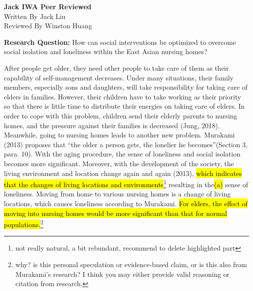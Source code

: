 \documentclass[12pt]{article}
\begin{document}
\begin{center}
    \Large\textbf{Jack IWA Peer Reviewed} \\
    Written By Jack Liu \\
    Reviewed By Winston Huang
\end{center}

\setlength{\marginparwidth}{5cm}  %



\textbf{Research Question:} How can social interventions be optimized to overcome social isolation and loneliness within the East Asian nursing homes? 

After people get older, they need other people to take care of them as their capability of self-management decreases. Under many situations, their family members, especially sons and daughters, will take responsibility for taking care of elders in families. However, their children have to take working as their priority so that there is little time to distribute their energies on taking care of elders.  In order to cope with this problem, children send their elderly parents to nursing homes, and the pressure against their families is decreased (Jung, 2018). Meanwhile, going to nursing homes leads to another new problem. 
Murakami (2013) proposes that “the older a person gets, the lonelier he becomes”(Section 3, para. 10). With the aging procedure, the sense of loneliness and social isolation becomes more significant. Moreover, with the development of the society, the living environment and location change again and again (2013), \hl{which indicates that the changes of living locations and environments}\footnote{not really natural, a bit rebundant, recommend to delete highlighted part} resulting in the\hl{(a)}  sense of loneliness. Moving from home to various nursing homes is a change of living locations, which causes loneliness according to Murakami. \hl{For elders, the effect of moving into nursing homes would be more significant than that for normal populations.}\footnote{why? is this personal speculation or evidence-based claim, or is this also from Murakami's research? I think you may either provide valid reasoning or citation from research.}
\end{document}
